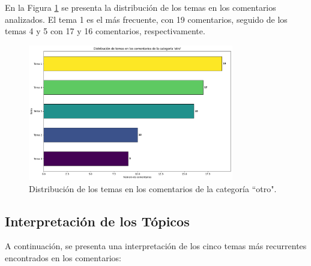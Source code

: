 \documentclass{matematicasud}
\begin{document}
En la Figura \ref{fig:distribucion_temas} se presenta la distribución de los temas en los comentarios analizados. El tema 1 es el más frecuente, con 19 comentarios, seguido de los temas 4 y 5 con 17 y 16 comentarios, respectivamente. 

\begin{figure}[h!]
    \centering
    \includegraphics[width=0.8\textwidth]{imaged.png}
    \caption{Distribución de los temas en los comentarios de la categoría ``otro".}
    \label{fig:distribucion_temas}
\end{figure}

\subsection{Interpretación de los Tópicos}

A continuación, se presenta una interpretación de los cinco temas más recurrentes encontrados en los comentarios:
\end{document}
